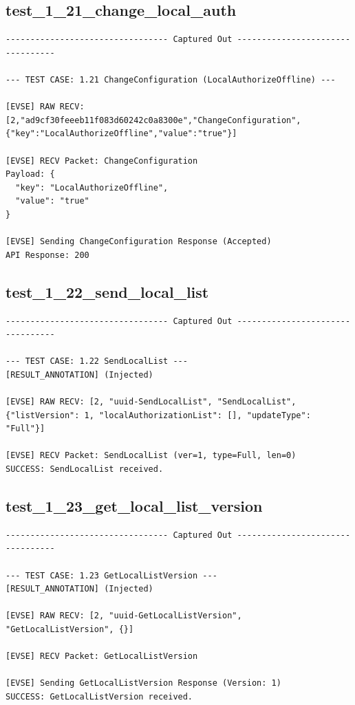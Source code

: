 \documentclass{article}
\begin{document}
\subsection*{test\_1\_21\_change\_local\_auth}
\begin{lstlisting}
--------------------------------- Captured Out ---------------------------------

--- TEST CASE: 1.21 ChangeConfiguration (LocalAuthorizeOffline) ---

[EVSE] RAW RECV: [2,"ad9cf30feeeb11f083d60242c0a8300e","ChangeConfiguration",{"key":"LocalAuthorizeOffline","value":"true"}]

[EVSE] RECV Packet: ChangeConfiguration
Payload: {
  "key": "LocalAuthorizeOffline",
  "value": "true"
}

[EVSE] Sending ChangeConfiguration Response (Accepted)
API Response: 200
\end{lstlisting}
\subsection*{test\_1\_22\_send\_local\_list}
\begin{lstlisting}
--------------------------------- Captured Out ---------------------------------

--- TEST CASE: 1.22 SendLocalList ---
[RESULT_ANNOTATION] (Injected)

[EVSE] RAW RECV: [2, "uuid-SendLocalList", "SendLocalList", {"listVersion": 1, "localAuthorizationList": [], "updateType": "Full"}]

[EVSE] RECV Packet: SendLocalList (ver=1, type=Full, len=0)
SUCCESS: SendLocalList received.
\end{lstlisting}
\subsection*{test\_1\_23\_get\_local\_list\_version}
\begin{lstlisting}
--------------------------------- Captured Out ---------------------------------

--- TEST CASE: 1.23 GetLocalListVersion ---
[RESULT_ANNOTATION] (Injected)

[EVSE] RAW RECV: [2, "uuid-GetLocalListVersion", "GetLocalListVersion", {}]

[EVSE] RECV Packet: GetLocalListVersion

[EVSE] Sending GetLocalListVersion Response (Version: 1)
SUCCESS: GetLocalListVersion received.
\end{lstlisting}
\end{document}
